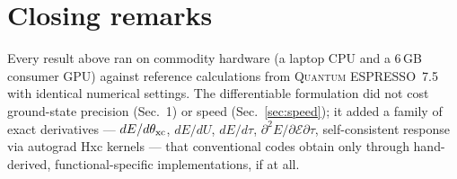 \documentclass[11pt]{article}
\newcommand{\qe}{\textsc{Quantum ESPRESSO}}
\begin{document}
\section{Closing remarks}

Every result above ran on commodity hardware (a laptop CPU and a 6\,GB
consumer GPU) against reference calculations from \qe{}~7.5 with identical
numerical settings. The differentiable formulation did not cost ground-state
precision (Sec.~1) or speed (Sec.~\ref{sec:speed}); it added a family of
exact derivatives --- $dE/d\theta_{\rm xc}$, $dE/dU$, $dE/d\tau$,
$\partial^2 E/\partial\mathcal{E}\partial\tau$, self-consistent response via
autograd Hxc kernels --- that conventional codes obtain only through
hand-derived, functional-specific implementations, if at all.
\end{document}

